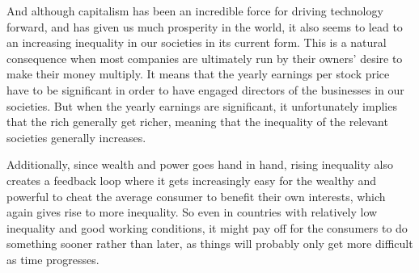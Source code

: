 \documentclass{article}
\begin{document}
And although capitalism has been an incredible force for driving technology forward, and has given us much prosperity in the world, it also seems to lead to an increasing inequality in our societies in its current form. This is a natural consequence when most companies are ultimately run by their owners' desire to make their money multiply. 
It means that the yearly earnings per stock price have to be significant in order to have engaged directors of the businesses in our societies. %
But when the yearly earnings are significant, it unfortunately implies that the rich generally get richer, %
meaning that the inequality of the relevant societies generally increases. 

Additionally, since wealth and power goes hand in hand, rising inequality also creates a feedback loop where it gets increasingly easy for the wealthy and powerful to cheat the average consumer to benefit their own interests, which again gives rise to more inequality. 
So even in countries with relatively low inequality and good working conditions, it might pay off for the consumers to do something sooner rather than later, as things will probably only get more difficult as time progresses.

%
\end{document}

